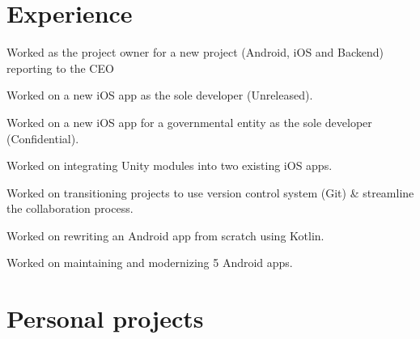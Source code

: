 \documentclass[]{Resume}
\begin{document}
\begin{minipage}[t]{0.66\textwidth} 


\section{Experience}
\vspace{\topsep} %
\begin{tightemize}
\item Worked as the project owner for a new project (Android, iOS and Backend) reporting to the CEO
\item Worked on a new iOS app as the sole developer (Unreleased).
\item Worked on a new iOS app for a governmental entity as the sole developer (Confidential).
\item Worked on integrating Unity modules into two existing iOS apps.
\item Worked on transitioning projects to use version control system (Git) \& streamline the collaboration process.
\item Worked on rewriting an Android app from scratch using Kotlin.
\item Worked on maintaining and modernizing 5 Android apps.
\end{tightemize}
\sectionsep


\section{Personal projects}

\sectionsep

\sectionsep

\sectionsep

\sectionsep

\end{minipage} 
\end{document}
